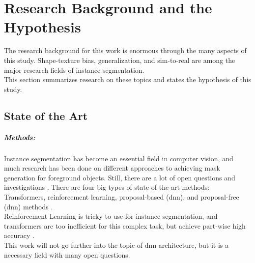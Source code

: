 
\chapter{Research Background and the Hypothesis}
\label{chap:kapitel2}

	The research background for this work is enormous through the many aspects of this study. Shape-texture bias, generalization, and sim-to-real are among the major research fields of instance segmentation.\\
	This section summarizes research on these topics and states the hypothesis of this study.

	\section{State of the Art}
	\label{sec:state-of-the-art}
		\paragraph{Methods:} Instance segmentation has become an essential field in computer vision, and much research has been done on different approaches to achieving mask generation for foreground objects. Still, there are a lot of open questions and investigations \cite{Sharma2022}. There are four big types of state-of-the-art methods: Transformers, reinforcement learning, proposal-based (\ac{dnn}), and proposal-free (\ac{dnn}) methods \cite{Sharma2022}.\\
		Reinforcement Learning is tricky to use for instance segmentation, and transformers are too inefficient for this complex task, but achieve part-wise high accuracy \cite{Sharma2022}.\\
		This work will not go further into the topic of \ac{dnn} architecture, but it is a necessary field with many open questions.
